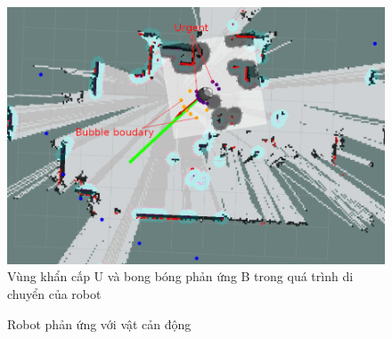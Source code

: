 \begin{figure}[htbp]
    \centering
    \includegraphics[width=\linewidth]{figures/RB_bb_urgent.png}
    \caption{Vùng khẩn cấp U và bong bóng phản ứng B trong quá trình di chuyển của robot}
    \label{fig:bb_urgent}
\end{figure}

\begin{figure}[htbp]
    \centering
    \hspace{8pt}
    \caption{Robot phản ứng với vật cản động}
    \label{fig:ir-detected-reaction}
\end{figure}

